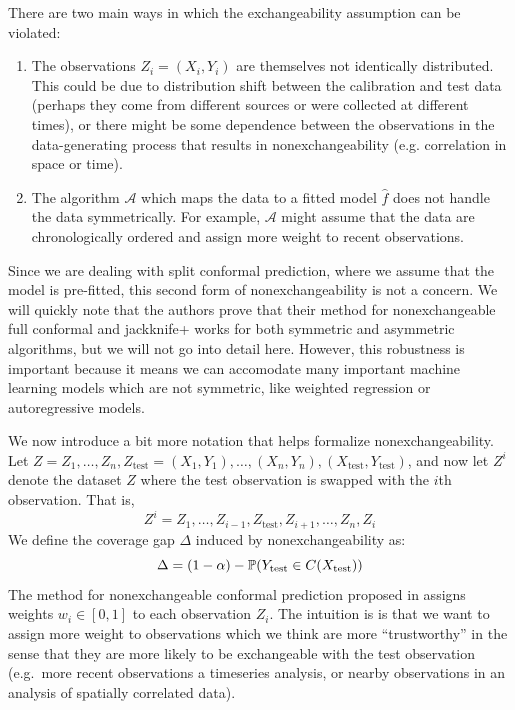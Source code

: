 \documentclass[a4paper, 12pt]{article}
\begin{document}
There are two main ways in which the exchangeability assumption can be violated:
\begin{enumerate}
    \item The observations $Z_i = (X_i, Y_i)$ are themselves not identically distributed. This could be due to distribution shift between the calibration and test data (perhaps they come from different sources or were collected at different times), or there might be some dependence between the observations in the data-generating process that results in nonexchangeability (e.g. correlation in space or time).
    \item The algorithm $\mathcal{A}$ which maps the data to a fitted model $\hat{f}$ does not handle the data symmetrically. For example, $\mathcal{A}$ might assume that the data are chronologically ordered and assign more weight to recent observations.
\end{enumerate}
Since we are dealing with split conformal prediction, where we assume that the model is pre-fitted, this second form of nonexchangeability is not a concern. We will quickly note that the authors prove that their method for nonexchangeable full conformal and jackknife+ works for both symmetric and asymmetric algorithms, but we will not go into detail here. However, this robustness is important because it means we can accomodate many important machine learning models which are not symmetric, like weighted regression or autoregressive models.

We now introduce a bit more notation that helps formalize nonexchangeability. Let $Z = Z_1, \ldots, Z_n, Z_{\text{test}} = (X_1, Y_1), \ldots, (X_n, Y_n), (X_{\text{test}}, Y_{\text{test}})$, and now let $Z^i$ denote the dataset $Z$ where the test observation is swapped with the $i$th observation. That is, $$Z^i = Z_1, \ldots, Z_{i-1}, Z_{\text{test}}, Z_{i+1}, \ldots, Z_n, Z_i$$
We define the coverage gap $\Delta$ induced by nonexchangeability as:
\[ \Delta = (1-\alpha) - \P(Y_{\text{test}} \in C(X_{\text{test}})) \]
The method for nonexchangeable conformal prediction proposed in \citeauthor{barberConformalPredictionExchangeability2023} assigns weights $w_i \in [0, 1]$ to each observation $Z_i$. The intuition is is that we want to assign more weight to observations which we think are more ``trustworthy'' in the sense that they are more likely to be exchangeable with the test observation (e.g.\ more recent observations a timeseries analysis, or nearby observations in an analysis of spatially correlated data).
\end{document}
